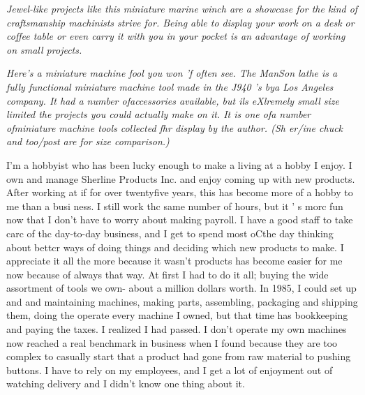 \bigskip\textit{ Jewel-like projects like this miniature marine winch are a
showcase for the kind of craftsmanship machinists strive for. Being able to
display your work on a desk or coffee table or even carry it with you in your
pocket is an advantage of working on small projects.}\bigskip

\bigskip\textit{Here's a miniature machine fool you won 'f often see. The ManSon
lathe is a fully functional miniature machine tool made in the J940 's bya Los
Angeles company. It had a number ofaccessories available, but ils eXlremely
small size limited the projects you could actually make on it. It is one ofa
number ofminiature machine tools collected fhr display by the author. (Sh er/ine
chuck and too/post are for size comparison.) }\bigskip


I'm a hobbyist who has been lucky enough to make a living at a hobby I enjoy.
I own and manage Sherline Products Inc. and enjoy coming up with new products.
After working at if for over twentyfive years, this has become more of a hobby
to me than a busi ness. I still work thc same number of hours, but it ' s morc
fun now that I don't have to worry about making payroll. I have a good staff to
take carc of thc day-to-day business, and I get to spend most oCthe day thinking
about bettcr ways of doing things and deciding which new products to make. I
appreciate it all the more because it wasn't products has become easier for me
now because of always that way. At first I had to do it all; buying the wide
assortment of tools we own- about a million dollars worth. In 1985, I could set
up and and maintaining machines, making parts, assembling, packaging and
shipping them, doing the operate every machine I owned, but that time has
bookkeeping and paying the taxes. I realized I had passed. I don't operate my
own machines now reached a real benchmark in business when I found because they
are too complex to casually start that a product had gone from raw material to
pushing buttons. I have to rely on my employees, and I get a lot of enjoyment
out of watching delivery and I didn't know one thing about it.


